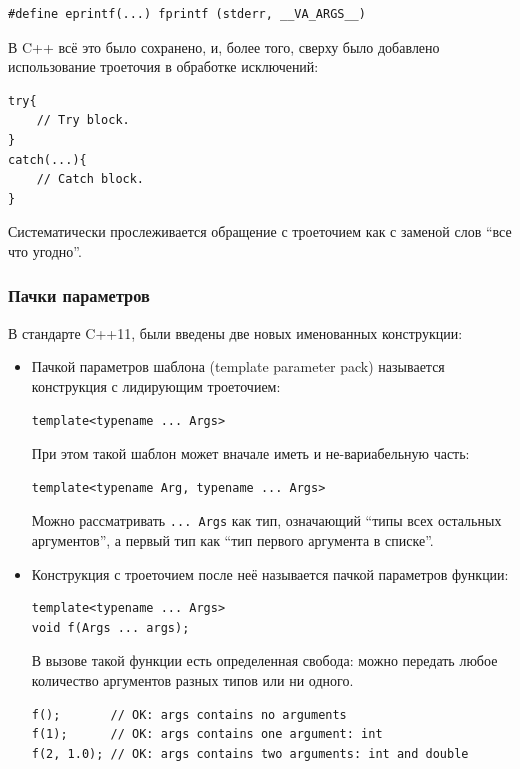 \documentclass[a4paper,12pt,oneside]{article}
\begin{document}
\begin{lstlisting}
#define eprintf(...) fprintf (stderr, __VA_ARGS__)
\end{lstlisting}

В C++ всё это было сохранено, и, более того, сверху было добавлено использование троеточия в обработке исключений:

\begin{lstlisting}
try{
    // Try block.
}
catch(...){
    // Catch block.
}
\end{lstlisting}

Систематически прослеживается обращение с троеточием как с заменой слов ``все что угодно''.

\subsubsection{Пачки параметров}\label{ParamPack}

В стандарте C++11, были введены две новых именованных конструкции: 

\begin{itemize}
\item
Пачкой параметров шаблона (template parameter pack) называется конструкция с лидирующим троеточием:

\begin{lstlisting}
template<typename ... Args>
\end{lstlisting}

При этом такой шаблон может вначале иметь и не-вариабельную часть:

\begin{lstlisting}
template<typename Arg, typename ... Args>
\end{lstlisting}

Можно рассматривать \lstinline!... Args! как тип, означающий ``типы всех остальных аргументов'', а первый тип как ``тип первого аргумента в списке''.

\item
Конструкция с троеточием после неё называется пачкой параметров функции:

\begin{lstlisting}
template<typename ... Args>
void f(Args ... args);
\end{lstlisting}

В вызове такой функции есть определенная свобода: можно передать любое количество аргументов разных типов или ни одного.

\begin{lstlisting}
f();       // OK: args contains no arguments
f(1);      // OK: args contains one argument: int
f(2, 1.0); // OK: args contains two arguments: int and double
\end{lstlisting}
\end{itemize}
\end{document}

